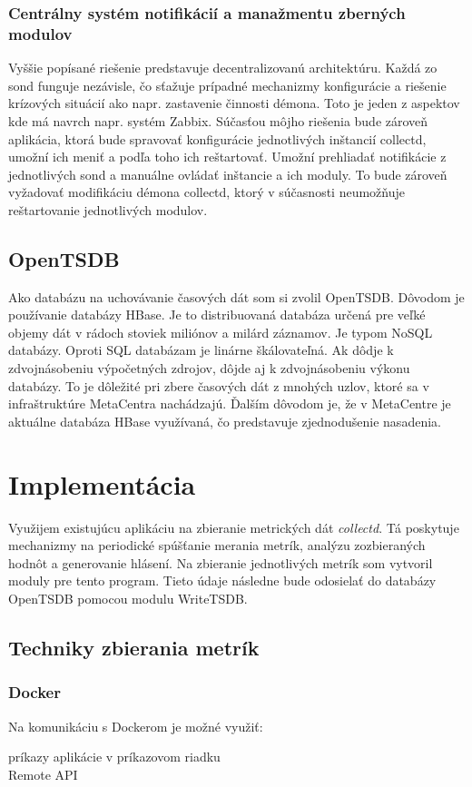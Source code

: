 \documentclass[11pt,final,oneside]{fithesis}
\begin{document}
\subsection{Centrálny systém notifikácií a manažmentu zberných modulov}
Vyššie popísané riešenie predstavuje decentralizovanú architektúru. Každá zo sond funguje nezávisle, čo sťažuje prípadné mechanizmy konfigurácie
a riešenie krízových situácií ako napr. zastavenie činnosti démona. Toto je jeden z aspektov kde má navrch napr. systém Zabbix. Súčasťou
môjho riešenia bude zároveň aplikácia, ktorá bude spravovať konfigurácie jednotlivých inštancií collectd, umožní ich meniť a podľa toho ich reštartovať.
Umožní prehliadať notifikácie z jednotlivých sond a manuálne ovládať inštancie a ich moduly. To bude zároveň vyžadovať modifikáciu démona
collectd, ktorý v súčasnosti neumožňuje reštartovanie jednotlivých modulov.

\section{OpenTSDB}
Ako databázu na uchovávanie časových dát som si zvolil OpenTSDB. Dôvodom je používanie databázy HBase. Je to distribuovaná databáza určená pre veľké objemy dát v rádoch stoviek miliónov a milárd záznamov. 
Je typom NoSQL databázy. Oproti SQL databázam je linárne škálovateľná. Ak dôdje k zdvojnásobeniu výpočetných zdrojov, dôjde aj k zdvojnásobeniu výkonu databázy. To je dôležité pri zbere časových dát z mnohých
uzlov, ktoré sa v infraštruktúre MetaCentra nachádzajú. Ďalším dôvodom je, že v MetaCentre je aktuálne databáza HBase využívaná, čo predstavuje zjednodušenie nasadenia. 


\chapter{Implementácia}
Využijem existujúcu aplikáciu na zbieranie metrických dát \emph{collectd}. Tá poskytuje mechanizmy na periodické spúšťanie merania metrík,
analýzu zozbieraných hodnôt a generovanie hlásení. Na zbieranie jednotlivých metrík som vytvoril moduly pre tento program. Tieto údaje následne bude odosielať do databázy OpenTSDB
pomocou modulu WriteTSDB.

\section{Techniky zbierania metrík}

\subsection{Docker}
Na komunikáciu s Dockerom je možné využiť:
\begin{description}
\item[príkazy aplikácie v príkazovom riadku]
\item[Remote API]
\end{description}
\end{document}
